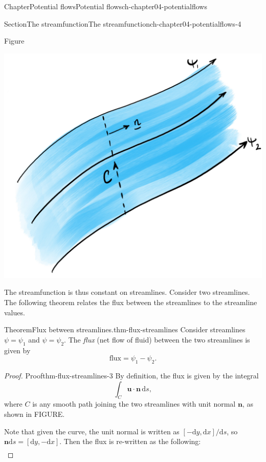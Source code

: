 \documentclass[oneside,10pt,]{book}
\numberwithin{equation}{section}
\newcommand{\de}{\mathrm{d}}
\newcommand{\bn}{\boldsymbol{n}}
\newcommand{\bu}{\boldsymbol{u}}
\begin{document}
\begin{chapterptx}{Chapter}{Potential flows}{}{Potential flows}{}{}{ch-chapter04-potentialflows}
\begin{sectionptx}{Section}{The streamfunction}{}{The streamfunction}{}{}{ch-chapter04-potentialflows-4}
\begin{introduction}{}
\begin{figureptx}{Figure}
\begin{image}{0.15}{0.7}{0.15}{}%
\includegraphics[width=\linewidth]{external/streamfunction.jpg}
\end{image}%
\tcblower
\end{figureptx}%
The streamfunction is thus constant on streamlines. Consider two streamlines. The following theorem relates the flux between the streamlines to the streamline values.%
\begin{theorem}{Theorem}{Flux between streamlines.}{}{thm-flux-streamlines}%
Consider streamlines \(\psi = \psi_1\) and \(\psi = \psi_2\). The \emph{flux} (net flow of fluid) between the two streamlines is given by%
\begin{equation*}
\textrm{flux} = \psi_1 - \psi_2.
\end{equation*}
%
\end{theorem}
\begin{proof}{Proof}{}{thm-flux-streamlines-3}
By definition, the flux is given by the integral%
\begin{equation*}
\int_C \bu \cdot \bn \, \de{s},
\end{equation*}
where \(C\) is any smooth path joining the two streamlines with unit normal \(\bn\), as shown in FIGURE.%
\par
Note that given the curve, the unit normal is written as \([-\de{y}, \de{x}]/\de s\), so \(\bn \de{s} = [\de{y}, -\de{x}]\). Then the flux is re-written as the following:%
\begin{align*}

\end{align*}
\end{proof}
\end{introduction}
\end{sectionptx}
\end{chapterptx}
\end{document}
